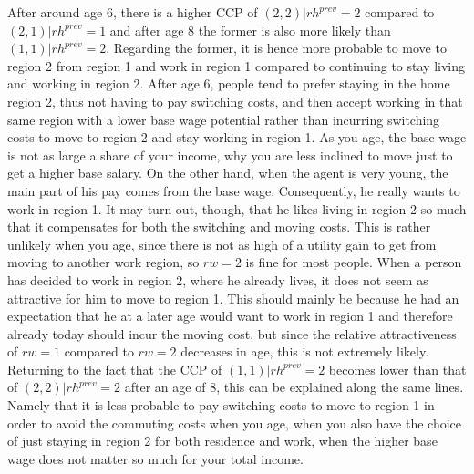 After around age 6, there is a higher CCP of $(2,2)|rh^{prev}=2$ compared to $(2,1)|rh^{prev}=1$ and after age 8 the former is also more likely than $(1,1)|rh^{prev}=2$. Regarding the former, it is hence more probable to move to region 2 from region 1 and work in region 1 compared to continuing to stay living and working in region 2. After age 6, people tend to prefer staying in the home region 2, thus not having to pay switching costs, and then accept working in that same region with a lower base wage potential rather than incurring switching costs to move to region 2 and stay working in region 1. As you age, the base wage is not as large a share of your income, why you are less inclined to move just to get a higher base salary. On the other hand, when the agent is very young, the main part of his pay comes from the base wage. Consequently, he really wants to work in region 1. It may turn out, though, that he likes living in region 2 so much that it compensates for both the switching and moving costs. This is rather unlikely when you age, since there is not as high of a utility gain to get from moving to another work region, so $rw=2$ is fine for most people. When a person has decided to work in region 2, where he already lives, it does not seem as attractive for him to move to region 1. This should mainly be because he had an expectation that he at a later age would want to work in region 1 and therefore already today should incur the moving cost, but since the relative attractiveness of $rw=1$ compared to $rw=2$ decreases in age, this is not extremely likely. Returning to the fact that the CCP of $(1,1)|rh^{prev}=2$ becomes lower than that of $(2,2)|rh^{prev}=2$ after an age of 8, this can be explained along the same lines. Namely that it is less probable to pay switching costs to move to region 1 in order to avoid the commuting costs when you age, when you also have the choice of just staying in region 2 for both residence and work, when the higher base wage does not matter so much for your total income.

